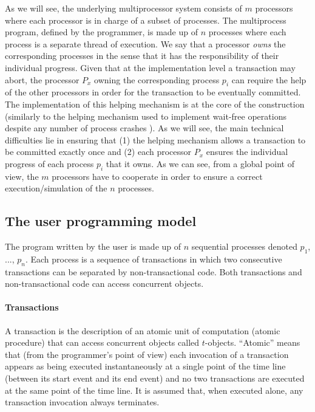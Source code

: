 As we will see, the underlying multiprocessor system  consists of 
$m$  processors where each processor is in charge  of a  subset of  processes.
The  multiprocess program, defined  by the  programmer, is  made up  of $n$
processes  where each process is a separate thread of execution.
 We say that a processor {\it owns}
the corresponding processes in the sense that  it has the responsibility 
of their individual   progress.  Given that at  the implementation level
a  transaction may abort, the processor $P_x$ owning the corresponding 
process $p_i$ can  require the help of  the other  processors  
in order for the transaction to be eventually committed. 
The  implementation of this  helping mechanism  is at the core of the 
construction  (similarly to the helping mechanism used  to implement 
wait-free operations despite any number of process crashes \cite{H91}). 
As we  will  see, the  main technical difficulties  lie  in   ensuring that 
(1) the helping  mechanism  allows   a transaction to be committed  exactly
once and (2) each processor $P_x$ ensures the individual progress  of  each 
process $p_i$ that it owns. As we can see, from a global point of view,
the  $m$ processors have to    cooperate in order to ensure a correct
execution/simulation of the $n$  processes. 


\subsection{The  user programming model}

The program written by the user is made up of $n$ sequential processes
denoted $p_1$, ..., $p_n$. Each process is a sequence of transactions 
in which two consecutive transactions can be separated by non-transactional 
code. Both transactions and  non-transactional code can access concurrent 
objects.

\paragraph{Transactions}
A transaction is the description of an atomic unit of computation 
(atomic procedure) that can access concurrent objects called $t$-objects. 
``Atomic'' means that (from the programmer's point of view) each 
invocation of a transaction appears as being executed 
instantaneously at a single point of  the time line (between its start event
and its end event) and no two transactions are executed at the same point 
of the time line.  It is  assumed that, when executed alone, 
any  transaction  invocation always terminates.  

